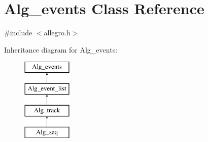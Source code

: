 \hypertarget{class_alg__events}{}\section{Alg\+\_\+events Class Reference}
\label{class_alg__events}


{\ttfamily \#include $<$allegro.\+h$>$}

Inheritance diagram for Alg\+\_\+events\+:\begin{figure}[H]
\begin{center}
\leavevmode
\includegraphics[height=4.000000cm]{class_alg__events}
\end{center}
\end{figure}
